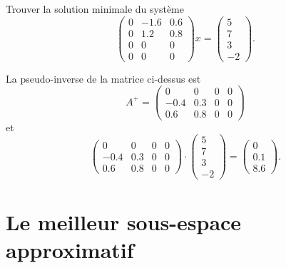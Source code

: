\begin{example}
  \label{exe:19}
  Trouver la solution minimale du système 
  \begin{displaymath}
     \begin{pmatrix}
      0 & -1.6  & 0.6 \\
      0 & 1.2 & 0.8 \\
      0 & 0 & 0 \\
      0 & 0 & 0
    \end{pmatrix} x =
    \begin{pmatrix}
      5\\7\\3\\-2
    \end{pmatrix}.
  \end{displaymath}

La pseudo-inverse  de la matrice ci-dessus est 
\begin{displaymath}
  A^+ = \begin{pmatrix}0 & 0 & 0 & 0\\-0.4 & 0.3 & 0 & 0\\0.6 & 0.8 & 0 & 0\end{pmatrix}
\end{displaymath}
et 
\begin{displaymath}
  \begin{pmatrix}0 & 0 & 0 & 0\\-0.4 & 0.3 & 0 & 0\\0.6 & 0.8 & 0 & 0\end{pmatrix} \cdot
  \begin{pmatrix}
    5\\7\\3\\-2
  \end{pmatrix}
 =
 \begin{pmatrix}
   0\\0.1\\8.6
 \end{pmatrix}. 
\end{displaymath}
\end{example}





\section{Le meilleur sous-espace approximatif} 
\label{sec:le-meilleur-sous}

